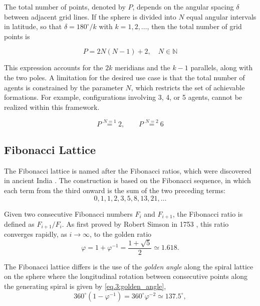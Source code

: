 The total number of points, denoted by $P$, depends on the angular spacing $\delta$ between adjacent grid lines. If the sphere is divided into $N$ equal angular intervals in latitude, so that $\delta = 180^\circ / k$ with $k = 1, 2, \ldots$, then the total number of grid points is

\begin{equation}
P = 2N(N - 1) + 2, \quad N \in \mathbb{N}
\end{equation}

This expression accounts for the $2k$ meridians and the $k - 1$ parallels, along with the two poles. A limitation for the desired use case is that the total number of agents is constrained by the parameter $N$, which restricts the set of achievable formations. For example, configurations involving 3, 4, or 5 agents, cannot be realized within this framework.

\begin{equation*}
    P \overset{N=1}{=} 2,\qquad
    P \overset{N=2}{=} 6
\end{equation*}

\subsection{Fibonacci Lattice}
\label{sec.3:Fibonacci Lattice}

The Fibonacci lattice is named after the Fibonacci ratios, which were discovered in ancient India \cite{fibonacci_history}. The construction is based on the Fibonacci sequence, in which each term from the third onward is the sum of the two preceding terms:
\[
0, 1, 1, 2, 3, 5, 8, 13, 21, \ldots
\]

Given two consecutive Fibonacci numbers $F_i$ and $F_{i+1}$, the Fibonacci ratio is defined as $F_{i+1}/F_i$. As first proved by Robert Simson in 1753 \cite{fibonacci_to_golden_ratio_1,fibonacci_to_golden_ratio_2}, this ratio converges rapidly, as $i \to \infty$, to the golden ratio
\begin{equation}
  \varphi = 1 + \varphi^{-1} = \frac{1 + \sqrt{5}}{2} \simeq 1.618 .
  \label{eq:golden_ratio}
\end{equation}

The Fibonacci lattice differs is the use of the \emph{golden angle} along the spiral lattice on the sphere where the longitudinal rotation between consecutive points along the generating spiral is given by \ref{eq.3:golden_angle},
\begin{equation}
  360^\circ \left(1 - \varphi^{-1}\right)
  = 360^\circ \varphi^{-2}
  \simeq 137.5^\circ ,
  \label{eq.3:golden_angle}
\end{equation}


